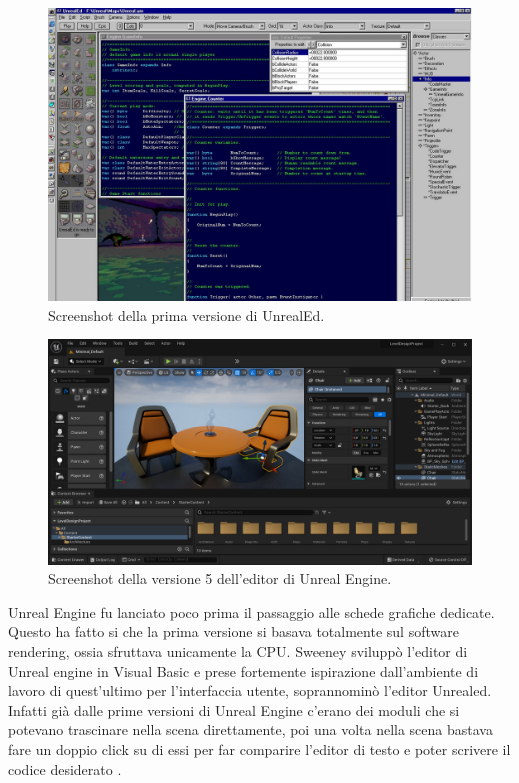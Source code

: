 \begin{figure}[t]
    \centering
    \includegraphics[width=.9\textwidth]{figure/UnrelEngineEditor1.jpg}
    \caption{Screenshot della prima versione di UnrealEd.}
\end{figure}
\begin{figure}[b]
    \centering
    \includegraphics[width=.9\textwidth]{figure/01-level-editor-windows.png}
    \caption{Screenshot della versione 5 dell'editor di Unreal Engine.}
\end{figure}


Unreal Engine fu lanciato poco prima il passaggio alle schede grafiche dedicate.
%
Questo ha fatto si che la prima versione si basava totalmente sul software rendering, ossia sfruttava unicamente la CPU. 
%
Sweeney sviluppò l'editor di Unreal engine in Visual Basic e prese fortemente ispirazione dall'ambiente di lavoro di quest'ultimo per l'interfaccia utente, soprannominò l'editor Unrealed.
%
Infatti già dalle prime versioni di Unreal Engine c'erano dei moduli che si potevano trascinare nella scena direttamente, poi una volta nella scena bastava fare un doppio click su di essi per far comparire l'editor di testo e poter scrivere il codice desiderato \cite{InterviewSweeney}.

